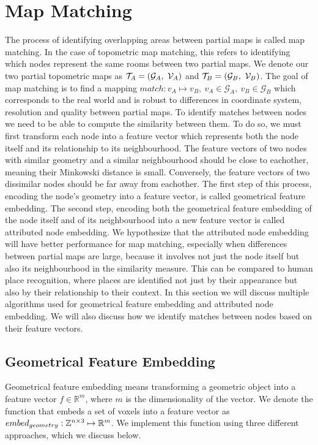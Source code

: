\section{Map Matching}
The process of identifying overlapping areas between partial maps is called map matching. In the case of topometric map matching, this refers to identifying which nodes represent the same rooms between two partial maps. We denote our two partial topometric maps as \(\topometricmap_A = (\mathcal{G}_A,\ \voxelgrid_A)\) and \(\mathcal{T}_B = (\mathcal{G}_B,\ \mathcal{V}_B)\). The goal of map matching is to find a mapping \(match: v_A \mapsto v_B,\ v_A \in \mathcal{G}_A,\ v_B \in \mathcal{G}_B\) which corresponds to the real world and is robust to differences in coordinate system, resolution and quality between partial maps. To identify matches between nodes we need to be able to compute the similarity between them. To do so, we must first transform each node into a feature vector which represents both the node itself and its relationship to its neighbourhood. The feature vectors of two nodes with similar geometry and a similar neighbourhood should be close to eachother, meaning their Minkowski distance is small. Conversely, the feature vectors of two dissimilar nodes should be far away from eachother. The first step of this process, encoding the node's geometry into a feature vector, is called geometrical feature embedding. The second step, encoding both the geometrical feature embedding of the node itself and of its neighbourhood into a new feature vector is called attributed node embedding. We hypothesize that the attributed node embedding will have better performance for map matching, especially when differences between partial maps are large, because it involves not just the node itself but also its neighbourhood in the similarity measure. This can be compared to human place recognition, where places are identified not just by their appearance but also by their relationship to their context. In this section we will discuss multiple algorithms used for geometrical feature embedding and attributed node embedding. We will also discuss how we identify matches between nodes based on their feature vectors.

\subsection{Geometrical Feature Embedding}
Geometrical feature embedding means transforming a geometric object into a feature vector \(f \in \mathbb{R}^m\), where \(m\) is the dimensionality of the vector. We denote the function that embeds a set of voxels into a feature vector as \(embed_{geometry}: \mathbb{Z}^{n \times 3} \mapsto \mathbb{R}^m\). We implement this function using three different approaches, which we discuss below.

